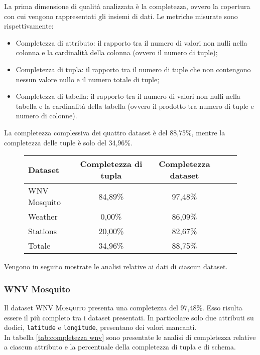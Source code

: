 La prima dimensione di qualità analizzata è la completezza, ovvero la copertura 
con cui vengono rappresentati gli insiemi di dati. Le metriche misurate sono 
rispettivamente:
\begin{itemize}
	\item Completezza di attributo: il rapporto tra il numero di valori non
	nulli nella colonna e la cardinalità della colonna (ovvero il numero di 
	tuple);
	\item Completezza di tupla: il rapporto tra il numero di tuple che non 
	contengono nessun valore nullo e il numero totale di tuple;
	\item Completezza di tabella: il rapporto tra il numero di valori non nulli 
	nella tabella e la cardinalità della tabella (ovvero il prodotto tra numero 
	di tuple e numero di colonne).
\end{itemize}


La completezza complessiva dei quattro dataset è del 88,75\%, mentre la 
completezza delle tuple è solo del 34,96\%.

\begin{figure}[H]
	\centering
	\begin{tabular}{lcccc}
		\toprule
		\textbf{Dataset} \quad & \textbf{Completezza di tupla} & \textbf{Completezza dataset} \\
		\midrule
		WNV Mosquito &		84,89\%  	& 97,48\%  \\ 
		Weather 	 &		 0,00\% 	& 86,09\%  \\ 
		Stations 	 &		20,00\% 	& 82,67\%  \\ 
		\midrule
		Totale 		 &	    34,96\%     & 88,75\%  \\
		\bottomrule
	\end{tabular}
	\label{tab:completezza totale}
\end{figure}

Vengono in seguito mostrate le analisi relative ai dati di ciascun dataset.

\subsubsection*{WNV Mosquito}
Il dataset \textsc{WNV Mosquito} presenta una completezza del 97,48\%. Esso risulta essere il più completo tra i dataset presentati. In particolare solo due attributi su dodici, \texttt{latitude} e \texttt{longitude}, presentano dei valori mancanti.\\
In tabella \ref{tab:completezza wnv} sono presentate le analisi di completezza relative a ciascun attributo e la percentuale della completezza di tupla e di schema.

